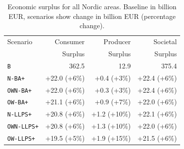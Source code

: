 \begin{table}[htbp]
\centering
\caption{Economic surplus for all Nordic areas. Baseline in billion EUR, scenarios show change in billion EUR (percentage change).}
\label{tab:surplus_nordic}
\begin{tabular}{lrrr}
\toprule
Scenario & Consumer & Producer & Societal \\
 & Surplus & Surplus & Surplus \\
\midrule
\multicolumn{1}{l}{\texttt{B}} & 362.5 & 12.9 & 375.4 \\
\midrule
\texttt{N-BA+} & +22.0 (+6\%) & +0.4 (+3\%) & +22.4 (+6\%) \\
\texttt{OWN-BA+} & +22.0 (+6\%) & +0.3 (+3\%) & +22.4 (+6\%) \\
\texttt{OW-BA+} & +21.1 (+6\%) & +0.9 (+7\%) & +22.0 (+6\%) \\
\midrule
\texttt{N-LLPS+} & +20.8 (+6\%) & +1.2 (+10\%) & +22.1 (+6\%) \\
\texttt{OWN-LLPS+} & +20.8 (+6\%) & +1.3 (+10\%) & +22.0 (+6\%) \\
\texttt{OW-LLPS+} & +19.5 (+5\%) & +1.9 (+15\%) & +21.5 (+6\%) \\
\bottomrule
\end{tabular}
\end{table}
